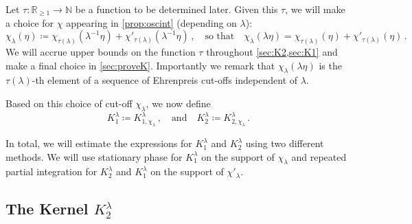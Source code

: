 \documentclass[
	fontsize=11pt, 
	twoside=false, 
	abstract=true, 
	a4paper,
]{scrartcl}
\newcommand{\RR}{\mathbb{R}}
\newcommand{\dd}{\mathrm{d}}
\newcommand{\abs}[1]{\left\lvert#1\right\rvert}
\newcommand{\an}{\quad\text{and}\quad}
\begin{document}
Let $\tau \colon \RR_{\geq 1} \to \mathbb{N}$ be a function to be determined later. Given this $\tau$, %
we will make a choice for $\chi$ appearing in \cref{prop:oscint} (depending on $\lambda$): %
\begin{equation}\label{eq:definechi}
	\chi_\lambda(\eta)\coloneqq \chi_{\tau(\lambda)}(\lambda^{-1}\eta) + \chi'_{\tau(\lambda)}(\lambda^{-1}\eta)\,,\quad\text{so that}\quad \chi_{\lambda}(\lambda\eta) = \chi_{\tau(\lambda)}(\eta) + \chi'_{\tau(\lambda)}(\eta)\,.
\end{equation}
We will accrue upper bounds on the function $\tau$ throughout \cref{sec:K2,sec:K1} and make a final choice in \cref{sec:proveK}. Importantly we remark that $\chi_{\lambda}(\lambda\eta)$ is the $\tau(\lambda)$-th element of a sequence of Ehrenpreis cut-offs independent of $\lambda$.

Based on this choice of cut-off $\chi_\lambda$, we now define
\begin{equation}\label{eq:fulldefK1K2}
	K_{1}^\lambda \coloneqq K_{1,\chi_{\lambda}}^\lambda %
	\,,\an K_{2}^\lambda \coloneqq K_{2,\chi_{\lambda}}^\lambda\,.
\end{equation}

In total, we will estimate the expressions for $K_1^\lambda$ and $K_2^\lambda$ using two different methods. We will use stationary phase for $K_1^\lambda$ on the support of $\chi_{\lambda}$ and repeated partial integration for $K_2^\lambda$ and $K_1^\lambda$ on the support of $\chi'_{\lambda}$.

\subsection{The Kernel $K_2^\lambda$}\label{sec:K2}

%
%
%
\end{document}
